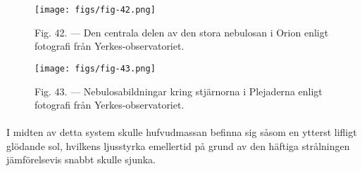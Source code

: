 \documentclass[a4paper, 12pt, oneside, swedish]{article}
\begin{document}
\begin{figure}[H]
\centering
\texttt{[image: figs/fig-42.png]}
\caption{Fig. 42. --- Den centrala delen av den stora nebulosan i Orion enligt fotografi från Yerkes-observatoriet.}
\end{figure}

\begin{figure}[H]
\centering
\texttt{[image: figs/fig-43.png]}
\caption{Fig. 43. --- Nebulosabildningar kring stjärnorna i Plejaderna enligt fotografi från Yerkes-observatoriet.}
\end{figure}
\paragraph{}
I midten av detta system skulle hufvudmassan befinna sig såsom en ytterst lifligt glödande sol, hvilkens ljusstyrka emellertid på grund av den häftiga strålningen jämförelsevis snabbt skulle sjunka.
\end{document}
